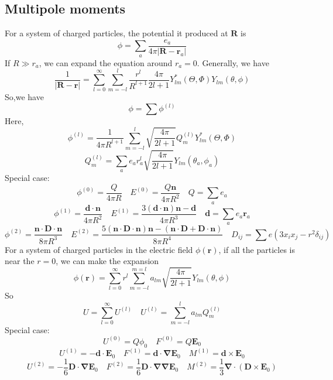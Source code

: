 \documentclass[cyan]{elegantnote}
\begin{document}
\subsection{Multipole moments}
For a system of charged particles, the potential it produced at $\bm{R}$ is
\[\phi = \sum_a \frac{e_a}{4\pi|\bm{R} - \bm{r}_a|}\]
If $R \gg r_a$, we can expand the equation around $r_a=0$. Generally, we have
\[\frac{1}{|\bm{R} - \bm{r}|} = \sum_{l=0}^{\infty} \sum_{m=-l}^{l} \frac{r^l}{R^{l+1}} \frac{4\pi}{2l+1} Y^*_{lm}(\Theta,\Phi)Y_{lm}(\theta,\phi)\]
So,we have
\[\phi = \sum \phi^{(l)}\]
Here,
\[\phi^{(l)} = \frac{1}{4\pi R^{l+1}} \sum_{m=-l}^{l} \sqrt{\frac{4\pi}{2l+1}} Q_{m}^{(l)} Y^*_{lm}(\Theta,\Phi)\]
\[Q_m^{(l)} =\sum_a e_a r_a^l \sqrt{\frac{4\pi}{2l+1}} Y_{lm}(\theta_a,\phi_a)\]
Special case: 
\[\phi^{(0)} = \frac{Q}{4\pi R} \quad E^{(0)} = \frac{Q\bm{n}}{4\pi R^2} \quad Q = \sum_a e_a\]
\[\phi^{(1)} = \frac{\bm{d} \cdot \bm{n}}{4\pi R^2}  \quad E^{(1)} = \frac{3(\bm{d}\cdot\bm{n})\bm{n}-\bm{d}}{4\pi R^3} \quad \bm{d} = \sum_a e_a \bm{r}_a\]
\[\phi^{(2)} = \frac{\bm{n} \cdot \bm{D} \cdot \bm{n}}{8\pi R^3} \quad E^{(2)} = \frac{5(\bm{n} \cdot \bm{D} \cdot \bm{n})\bm{n} - (\bm{n} \cdot \bm{D} + \bm{D} \cdot \bm{n})}{8\pi R^4} \quad D_{ij} = \sum e(3x_ix_j-r^2\delta_{ij})\]
For a system of charged particles in the electric field $\phi(\bm{r})$, if all the particles is near the $r=0$, we can make the expansion
\[\phi(\bm{r}) = \sum_{l=0}^{\infty} r^l \sum_{m=-l}^{m=l} a_{lm} \sqrt{\frac{4\pi}{2l+1}} Y_{lm}(\theta,\phi)\]
So
\[U = \sum_{l=0}^{\infty} U^{(l)} \quad U^{(l)} = \sum_{m=-l}^{l} a_{lm}Q^{(l)}_m\]
Special case:
\[U^{(0)} = Q\phi_0 \quad F^{(0)} = Q\bm{E}_0\]
\[U^{(1)} = -\bm{d}\cdot \bm{E}_0 \quad F^{(1)} = \bm{d}\cdot \bm{\nabla}\bm{E}_0 \quad M^{(1)} = \bm{d} \times \bm{E}_0\]
\[U^{(2)} = -\frac{1}{6}\bm{D}\cdot \bm{\nabla}\bm{E}_0 \quad F^{(2)} = \frac{1}{6} \bm{D}\cdot \bm{\nabla}\bm{\nabla}\bm{E}_0 \quad M^{(2)} = \frac{1}{3} \bm{\nabla} \cdot (\bm{D} \times \bm{E}_0)\]
\end{document}
